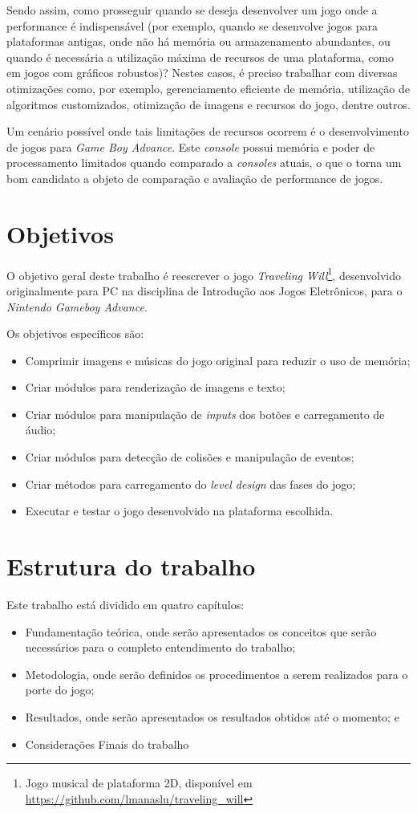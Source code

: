 Sendo assim, como prosseguir quando se deseja desenvolver um jogo onde a performance é indispensável (por exemplo, quando se desenvolve jogos para plataformas antigas, onde não há memória ou armazenamento abundantes, ou quando é necessária a utilização máxima de recursos de uma plataforma, como em jogos com gráficos robustos)? Nestes casos, é preciso trabalhar com diversas otimizações como, por exemplo, gerenciamento eficiente de memória, utilização de algoritmos customizados, otimização de imagens e recursos do jogo, dentre outros.

Um cenário possível onde tais limitações de recursos ocorrem é o desenvolvimento de jogos para \textit{Game Boy Advance}. Este \textit{console} possui memória e poder de processamento limitados quando comparado a \textit{consoles} atuais, o que o torna um bom candidato a objeto de comparação e avaliação de performance de jogos.

\section*{Objetivos}

O objetivo geral deste trabalho é reescrever o jogo \textit{Traveling Will}\footnote{Jogo musical de plataforma 2D, disponível em \url{https://github.com/lmanaslu/traveling_will}}, desenvolvido originalmente para PC na disciplina de Introdução aos Jogos Eletrônicos, para o \textit{Nintendo Gameboy Advance}.

Os objetivos específicos são:

\begin{itemize}
\item Comprimir imagens e músicas do jogo original para reduzir o uso de memória;
\item Criar módulos para renderização de imagens e texto;
\item Criar módulos para manipulação de \textit{inputs} dos botões e carregamento de áudio;
\item Criar módulos para detecção de colisões e manipulação de eventos;
\item Criar métodos para carregamento do \textit{level design} das fases do jogo;
\item Executar e testar o jogo desenvolvido na plataforma escolhida.
\end{itemize}

\section*{Estrutura do trabalho}

Este trabalho está dividido em quatro capítulos:

\begin{itemize}
  \item Fundamentação teórica, onde serão apresentados os conceitos que serão necessários para o completo entendimento do trabalho;
  \item Metodologia, onde serão definidos os procedimentos a serem realizados para o porte do jogo;
  \item Resultados, onde serão apresentados os resultados obtidos até o momento; e
  \item Considerações Finais do trabalho
\end{itemize}